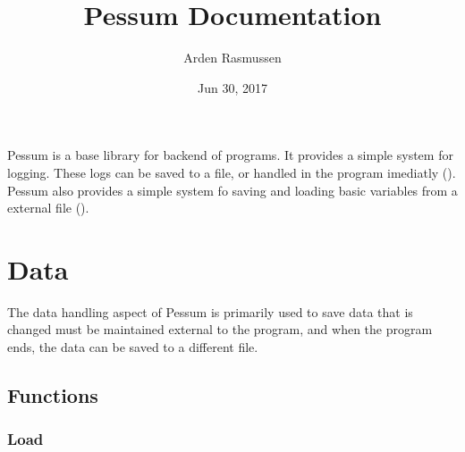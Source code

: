 \documentclass[letterpaper,10pt,english]{sphinxmanual}
\title{Pessum Documentation}
\date{Jun 30, 2017}
\author{Arden Rasmussen}
\begin{document}
\maketitle
\sphinxtableofcontents
{}\label{\detokenize{index::doc}}


Pessum is a base library for backend of programs. It provides a simple system
for logging. These logs can be saved to a file, or handled in the program
imediatly ({\hyperref[\detokenize{log::doc}]{}}). Pessum also provides a simple system fo saving and
loading basic variables from a external file ({\hyperref[\detokenize{data::doc}]{}}).


\chapter{Data}
\label{\detokenize{data::doc}}\label{\detokenize{data:pessum-documentation}}\label{\detokenize{data:data}}
The data handling aspect of Pessum is primarily used to save data that is
changed must be maintained external to the program, and when the program ends,
the data can be saved to a different file.


\section{Functions}
\label{\detokenize{data:functions}}

\subsection{Load}
\label{\detokenize{data:load}}
\end{document}
